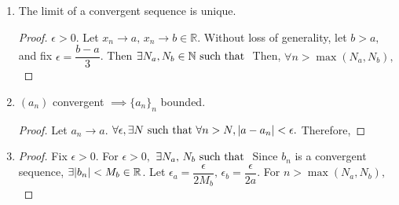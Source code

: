 \begin{enumerate}
    \item The limit of a convergent sequence is unique.
    \begin{proof}
        $\epsilon>0$. Let $x_n\rightarrow a,\,x_n\rightarrow b\in\mathbb{R}$. Without loss of generality, let $b>a,$ and fix $\epsilon=\dfrac{b-a}{3}$. Then $\exists N_a,N_b\in\mathbb{N}\text{ such that }$
        Then, $\forall n>\max(N_a,N_b),$
    \end{proof}    
    
    \item $(a_n)$ convergent $\implies \{a_n\}_n$ bounded.
    \begin{proof}
        Let $a_n\rightarrow a.$ $\forall \epsilon, \exists N\text{ such that } \forall n>N,\abs{a-a_n}<\epsilon.$ Therefore,
    \end{proof}
    
    \item 
    \begin{proof}
       Fix $\epsilon>0$. For $\epsilon>0,$ $\exists N_a,\,N_b\text{ such that }$
       Since $b_n$ is a convergent sequence, $\exists \abs{b_n} < M_b\in\mathbb{R}$. Let $\epsilon_a=\dfrac{\epsilon}{2M_b},\,\epsilon_b=\dfrac{\epsilon}{2a}$. For $n>\max(N_a,N_b),$
    \end{proof}
    

\end{enumerate}
